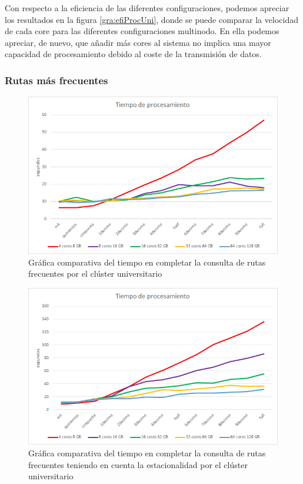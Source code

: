 Con respecto a la eficiencia de las diferentes configuraciones, podemos apreciar los resultados en la figura \ref{gra:efiProcUni}, donde se puede comparar la velocidad de cada core para las diferentes configuraciones multinodo. En ella podemos apreciar, de nuevo, que añadir más cores al sistema no implica una mayor capacidad de procesamiento debido al coste de la transmisión de datos.

\subsubsection{Rutas más frecuentes}
\begin{figure}[htp!]
	\centering
	\caption{Gráfica comparativa del tiempo en completar la consulta de rutas frecuentes por el clúster universitario}
	\label{gra:tiemFreqUni}
	\vspace{5pt}
	\includegraphics[scale=0.85]{graficas/tfuni}
\end{figure}
\begin{figure}[htp!]
	\centering
	\caption{Gráfica comparativa del tiempo en completar la consulta de rutas frecuentes teniendo en cuenta la estacionalidad por el clúster universitario}
	\label{gra:tiemFreqDayUni}
	\vspace{5pt}
	\includegraphics[scale=0.85]{graficas/tfduni}
\end{figure}
